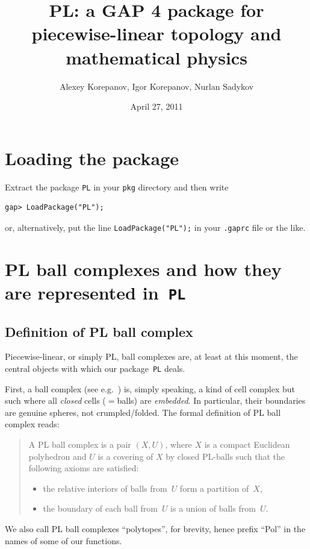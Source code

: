 \documentclass{article}
\title{PL: a GAP 4 package for piecewise-linear topology and mathematical physics}
\author{Alexey Korepanov, Igor Korepanov, Nurlan Sadykov}
\date{April 27, 2011}
\begin{document}
\maketitle

\tableofcontents


\section{Loading the package}

Extract the package \verb|PL| in your \verb|pkg| directory and then write
\begin{verbatim}
gap> LoadPackage("PL");
\end{verbatim}
or, alternatively, put the line \verb|LoadPackage("PL");| in your \verb|.gaprc| file or the like.


\section{PL ball complexes and how they are represented in~\tt{PL}}

\subsection{Definition of PL ball complex}

Piecewise-linear, or simply PL, ball complexes are, at least at this moment, the central objects with which our package~\verb|PL| deals.

First, a ball complex (see e.g.~\cite{Mnev}) is, simply speaking, a kind of cell complex but such where all \emph{closed} cells (${}={}$balls) are \emph{embedded}. In particular, their boundaries are genuine spheres, not crumpled/folded. The formal definition of PL ball complex reads:

\begin{quotation}
A PL ball complex is a pair $(X, U)$, where $X$ is a compact Euclidean polyhedron and $U$ is a covering of $X$ by closed PL-balls such that the following axioms are satisfied:
\begin{itemize}
\item the relative interiors of balls from~$U$ form a partition of~$X$,
\item the boundary of each ball from~$U$ is a union of balls from~$U$.
\end{itemize}
\end{quotation}

We also call PL ball complexes ``polytopes'', for brevity, hence prefix ``Pol'' in the names of some of our functions.
\end{document}

